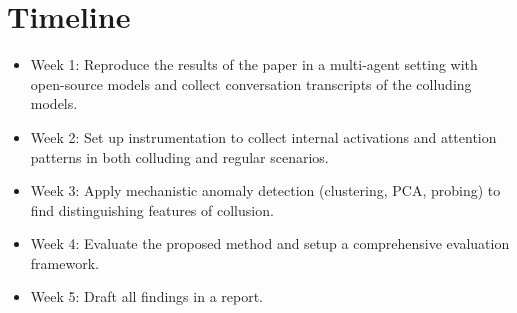 \documentclass{article}
\begin{document}
\section{Timeline}

\begin{itemize}
    \item Week 1: Reproduce the results of the paper \cite{motwani2024secret} in a multi-agent setting with open-source models and collect conversation transcripts of the colluding models.
    \item Week 2: Set up instrumentation to collect internal activations and attention patterns in both colluding and regular scenarios.
    \item Week 3: Apply mechanistic anomaly detection (clustering, PCA, probing) to find distinguishing features of collusion.
    \item Week 4: Evaluate the proposed method and setup a comprehensive evaluation framework.
    \item Week 5: Draft all findings in a report.
\end{itemize}



\end{document}

